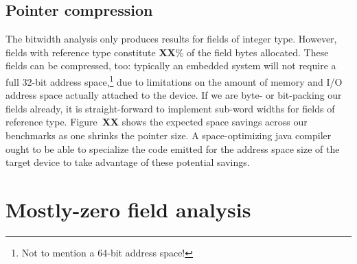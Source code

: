 \documentclass[preprint]{acmconf}
\begin{document}
\subsection{Pointer compression}\label{sec:ptrcmp}
The bitwidth analysis only produces results for fields of integer type.
However, fields with reference type constitute {\bf XX}\% of
the field bytes allocated.  These fields can be compressed, too:
typically an embedded system will not require a full 32-bit address
space,\footnote{Not to mention a 64-bit address space!} due to
limitations on the amount of memory and I/O address space actually attached
to the device.  If we are byte- or bit-packing our fields already,
it is straight-forward to implement sub-word widths for fields of
reference type.  Figure~{\bf XX} shows the expected space savings
across our benchmarks as one shrinks the pointer size.  A
space-optimizing java compiler ought to be able to specialize the code
emitted for the address space size of the target device to take
advantage of these potential savings.

\section{Mostly-zero field analysis}
\end{document}

